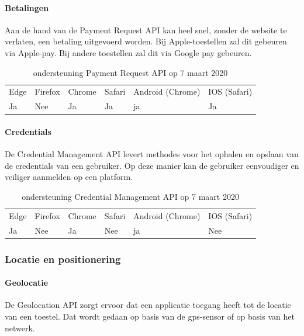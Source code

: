 \paragraph{Betalingen}
Aan de hand van de Payment Request API \autocite{Denicola2019} kan heel snel, zonder de website te verlaten, een betaling uitgevoerd worden. Bij Apple-toestellen zal dit gebeuren via Apple-pay. Bij andere toestellen zal dit via Google pay gebeuren.

\begin{table}[H]
	\centering
	\begin{tabular}{llllll}
		Edge & Firefox & Chrome & Safari & Android (Chrome) & IOS (Safari) \\
		Ja   & Nee      &  Ja     & Ja     & ja               & Ja          
	\end{tabular}	
	\caption{ondersteuning Payment Request API op 7 maart 2020}
\end{table}


\paragraph{Credentials}
De Credential Management API \autocite{West2019} levert methodes voor het ophalen en opslaan van de credentials van een gebruiker. Op deze manier kan de gebruiker eenvoudiger en veiliger aanmelden op een platform.

\begin{table}[H]
	\begin{tabular}{llllll}
		Edge & Firefox & Chrome & Safari & Android (Chrome) & IOS (Safari) \\
		Ja   & Nee      &  Ja     & Nee     & ja               & Nee          
	\end{tabular}	
	\caption{ondersteuning Credential Management API op 7 maart 2020}
\end{table}

\subsubsection{Locatie en positionering}

\paragraph{Geolocatie}
De Geolocation API \autocite{Popescu2018} zorgt ervoor dat een applicatie toegang heeft tot de locatie van een toestel. Dat wordt gedaan op basis van de gps-sensor of op basis van het netwerk. 

